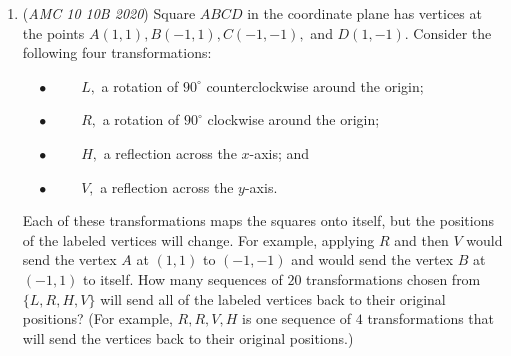\begin{enumerate}
 Thus, the remainder is $\boxed{\textbf{(D) } 201}$.

 



\textbf{Solution 6 (by Shiva Kumar Kannan - Least insightful & very straightforward + Manipulation)}

We can repeatedly manipulate the numerator to make parts of it divisible by the denominator:

 
 \[\frac{2^{202}+202}{2^{101}+2^{51}+1}\] 
 \[= \frac{2^{202} + 2^{152} + 2^{101}}{2^{101}+2^{51}+1} - \frac{2^{152} + 2^{101} - 202}{2^{101}+2^{51}+1}\] 
 \[= 2^{101} - \frac{2^{152} + 2^{101} - 202}{2^{101}+2^{51}+1}\] 
 \[=2^{101} - \frac{2^{152}+2^{101}+2^{101}+2^{51} - 2^{101} - 2^{51} - 202}{2^{101}+2^{51}+1}\] 
 \[=2^{101} - 2^{51} + \frac{2^{101}+2^{51}+202}{2^{101}+2^{51}+1}\] 
 \[= 2^{101} - 2^{51} + \frac{2^{101}+2^{51}+1+201}{2^{101}+2^{51}+1}\] 
 \[= 2^{101} - 2^{51} + 1 + \frac{201}{2^{101} + 2^{51} + 1}.\]

 Clearly, $201 < 2^{201} + 2^{51} + 1$, hence, we cannot manipulate the numerator further to make the denominator divide into one of its parts. This concludes, that the remainder is $\boxed{\textbf{(D) } 201}$.

 


	\item (\textit{AMC 10 10B 2020}) Square $ABCD$ in the coordinate plane has vertices at the points $A(1,1), B(-1,1), C(-1,-1),$ and $D(1,-1).$ Consider the following four transformations:


 $\quad\bullet\qquad$ $L,$ a rotation of $90^{\circ}$ counterclockwise around the origin;


 $\quad\bullet\qquad$ $R,$ a rotation of $90^{\circ}$ clockwise around the origin;


 $\quad\bullet\qquad$ $H,$ a reflection across the $x$-axis; and


 $\quad\bullet\qquad$ $V,$ a reflection across the $y$-axis.


 Each of these transformations maps the squares onto itself, but the positions of the labeled vertices will change. For example, applying $R$ and then $V$ would send the vertex $A$ at $(1,1)$ to $(-1,-1)$ and would send the vertex $B$ at $(-1,1)$ to itself. How many sequences of $20$ transformations chosen from $\{L, R, H, V\}$ will send all of the labeled vertices back to their original positions? (For example, $R, R, V, H$ is one sequence of $4$ transformations that will send the vertices back to their original positions.)



\end{enumerate}
